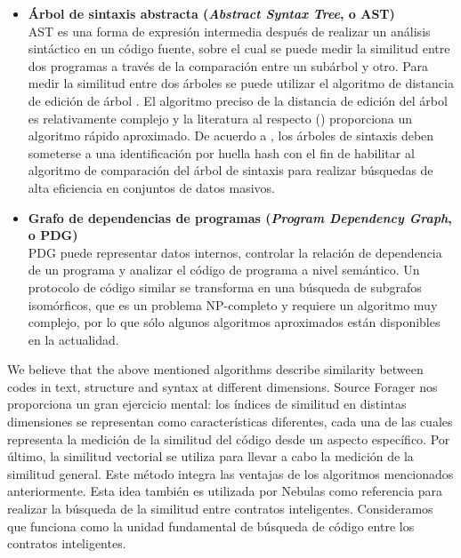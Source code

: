 \begin{itemize}
	\item \textbf{Árbol de sintaxis abstracta (\textit{Abstract Syntax Tree}, o AST)} \\
	AST es una forma de expresión intermedia después de realizar un análisis sintáctico en un código fuente, sobre el cual se puede medir la similitud entre dos programas a través de la comparación entre un subárbol y otro. Para medir la similitud entre dos árboles se puede utilizar el algoritmo de distancia de edición de árbol \cite{zhang1989simple}. El algoritmo preciso de la distancia de edición del árbol es relativamente complejo y la literatura al respecto (\cite{guha2002approximate}) proporciona un algoritmo rápido aproximado. De acuerdo a \cite{chilowicz2009syntax}, los árboles de sintaxis deben someterse a una identificación por huella hash con el fin de habilitar al algoritmo de comparación del árbol de sintaxis para realizar búsquedas de alta eficiencia en conjuntos de datos masivos.

	\item \textbf{Grafo de dependencias de programas (\textit{Program Dependency Graph}, o PDG)} \\
	PDG \cite{ferrante1987program} puede representar datos internos, controlar la relación de dependencia de un programa y analizar el código de programa a nivel semántico. Un protocolo de código similar se transforma en una búsqueda de subgrafos isomórficos, que es un problema NP-completo y requiere un algoritmo muy complejo, por lo que sólo algunos algoritmos aproximados están disponibles en la actualidad.

\end{itemize}

We believe that the above mentioned algorithms describe similarity between codes in text, structure and syntax at different dimensions. Source Forager \cite{kashyap2017source} nos proporciona un gran ejercicio mental: los índices de similitud en distintas dimensiones se representan como características diferentes, cada una de las cuales representa la medición de la similitud del código desde un aspecto específico. Por último, la similitud vectorial se utiliza para llevar a cabo la medición de la similitud general. Este método integra las ventajas de los algoritmos mencionados anteriormente. Esta idea también es utilizada por Nebulas como referencia para realizar la búsqueda de la similitud entre contratos inteligentes. Consideramos que funciona como la unidad fundamental de búsqueda de código entre los contratos inteligentes.

